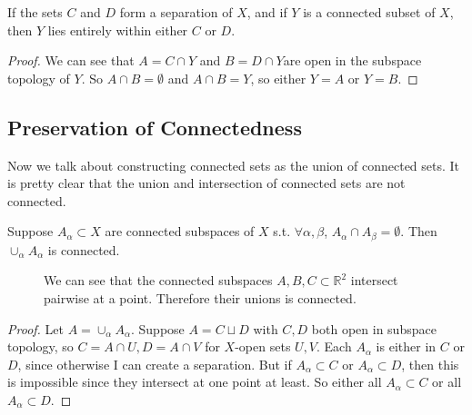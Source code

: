   \begin{lemma}
    If the sets $C$ and $D$ form a separation of $X$, and if $Y$ is a connected subset of $X$, then $Y$ lies entirely within either $C$ or $D$. 
  \end{lemma}
  \begin{proof}
    We can see that $A = C \cap Y$ and $B = D \cap Y$are open in the subspace topology of $Y$. So $A \cap B = \emptyset$ and $A \cap B = Y$, so either $Y = A$ or $Y = B$. 
  \end{proof}

\subsection{Preservation of Connectedness}

  Now we talk about constructing connected sets as the union of connected sets. It is pretty clear that the union and intersection of connected sets are not connected. 

  \begin{theorem}
    Suppose $A_\alpha \subset X$ are connected subspaces of $X$ s.t. $\forall \alpha, \beta$, $A_\alpha \cap A_\beta = \emptyset$. Then $\cup_\alpha A_\alpha$ is connected. 

    \begin{figure}[H]
      \centering 
      \caption{We can see that the connected subspaces $A, B, C \subset \mathbb{R}^2$ intersect pairwise at a point. Therefore their unions is connected. } 
    \end{figure}
  \end{theorem}
  \begin{proof}
    Let $A = \cup_\alpha A_\alpha$. Suppose $A = C \sqcup D$ with $C, D$ both open in subspace topology, so $C = A \cap U, D = A \cap V$ for $X$-open sets $U, V$. Each $A_\alpha$ is either in $C$ or $D$, since otherwise I can create a separation. But if $A_\alpha \subset C$ or $A_\alpha \subset D$, then this is impossible since they intersect at one point at least. So either all $A_\alpha \subset C$ or all $A_\alpha \subset D$. 
  \end{proof} 

